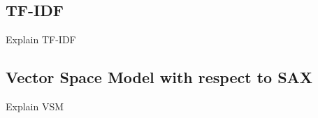 \subsection{TF-IDF}

	Explain TF-IDF
	
\subsection{Vector Space Model with respect to SAX}

	Explain VSM